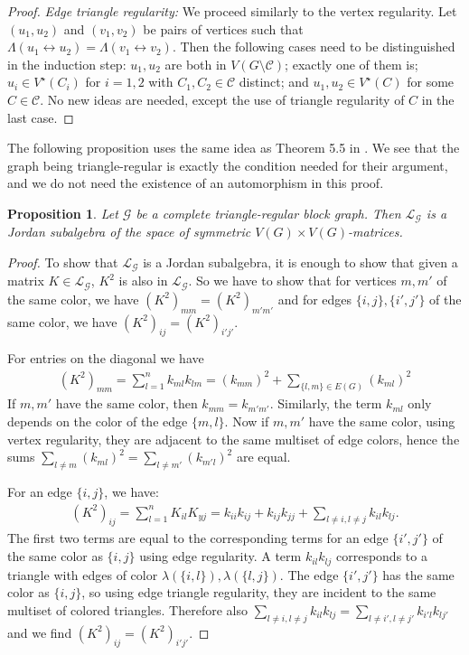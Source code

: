 \documentclass[a4paper, 11pt]{amsart}
\numberwithin{theorem}{section}
\newtheorem{proposition}[theorem]{Proposition}
\newcommand{\cC}{\mathcal{C}}
\begin{document}
\begin{proof}
    \textit{Edge triangle regularity:} We proceed similarly to the vertex
    regularity. Let $(u_1,u_2)$ and $(v_1,v_2)$ be pairs of vertices such
    that $\Lambda(u_1\leftrightarrow u_2) = \Lambda(v_1\leftrightarrow
    v_2)$. Then the following cases need to be distinguished in the
    induction step: $u_1,u_2$ are both in $V(G \setminus \cC)$; exactly
    one of them is; $u_i \in V^\star(C_i)$ for $i=1,2$ with $C_1,C_2 \in
    \cC$ distinct; and $u_1,u_2 \in V^\star(C)$ for some $C \in \cC$. No
    new ideas are needed, except the use of triangle regularity of $C$
    in the last case.
\end{proof}

The following proposition uses the same idea as Theorem 5.5 in \cite{CMMPS23}. We see that the graph being triangle-regular is exactly the condition needed for their argument, and we do not need the existence of an automorphism in this proof. 

\begin{proposition}
\label{prop:completeGraphIsJordanAlgebra}
Let $\mathcal{G}$ be a complete triangle-regular block graph. Then
$\mathcal{L}_{\mathcal{G}}$ is a Jordan subalgebra of the space of
symmetric $V(G) \times V(G)$-matrices. 
\end{proposition}
\begin{proof}
To show that $\mathcal{L}_{\mathcal{G}}$ is a Jordan subalgebra, it is
enough to show that given a matrix $K \in \mathcal{L}_{\mathcal{G}}$,
$K ^ 2$ is also in $\mathcal{L}_{\mathcal{G}}$. So we have to show
that for vertices $m,m'$ of the same color, we have $(K^2)_{mm} =
(K^2)_{m'm'}$ and for edges $\{i,j\},\{i',j'\}$ of the same color,
we have $(K^2)_{ij} = (K^2)_{i'j'}$.

For entries on the diagonal we have
\begin{align*}
(K^2)_{mm} = \sum _{l = 1}^n k_{ml}k_{lm} = (k_{mm})^2 + \sum
_{\{l,m\} \in E(G)} (k_{ml})^2 
\end{align*}
If $m,m'$ have the same color, then $k_{mm} = k_{m'm'}$. Similarly,
the term $k_{ml}$ only depends on the color of the edge $\{m,l\}$. Now
if $m,m'$ have the same color, using vertex regularity, they are adjacent to the same multiset
of edge colors, hence the sums $\sum _{l \neq m} (k_{ml})^2 = \sum _{l
\neq m'} (k_{m'l})^2 $ are equal.

For an edge $\{i,j\}$, we have:
\begin{align*}
(K^2)_{ij} = \sum _{l = 1}^n K_{il} K_{yj} =  k_{ii}k_{ij} + k_{ij}k_{jj} + \sum _{l \neq i, l \neq j} k_{il}k_{lj}.
\end{align*}
The first two terms are equal to the corresponding terms for
an edge $\{i',j'\}$ of the same color as $\{i,j\}$ using edge regularity. 
A term $k_{il}k_{lj}$ corresponds to a triangle with edges of color
$\lambda (\{i,l\}),\lambda (\{l,j\})$. The edge
$\{i',j'\}$ has the same color as $\{i,j\}$, so using edge triangle regularity, they are incident to
the same multiset of colored triangles. Therefore also $\sum _{l \neq
i, l \neq j} k_{il}k_{lj} = \sum _{l \neq i', l \neq j'}
k_{i'l}k_{lj'}$ and we find $ (K^2)_{ij} = (K^2)_{i'j'}$.
\end{proof}
\end{document}
